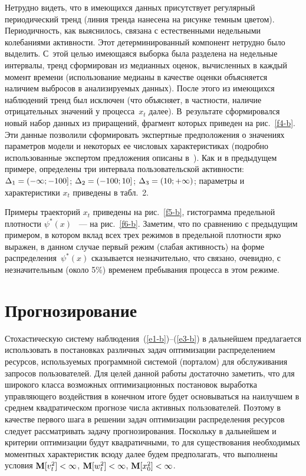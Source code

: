 \begin{multicols}{2}
\renewcommand{\figurename}{\protect\bf Рис.}
\renewcommand{\tablename}{\protect\bf Таблица}
\setcounter{table}{2}
\setcounter{figure}{6}

  
  Нетрудно видеть, что в имеющихся данных присутствует регулярный периодический 
тренд (линия тренда нанесена на рисунке темным цветом). Периодичность, как выяснилось, 
связана с естественными недельными колебаниями активности. Этот детерминированный 
компонент нетрудно было выделить. С~этой целью имеющаяся выборка была разделена на 
недельные интервалы, тренд сформирован из медианных оценок, вычисленных в каж\-дый 
момент времени (использование медианы в качестве оценки объясняется наличием выбросов 
в анализируемых данных). После этого из имеющихся наблюдений тренд был исключен (что 
объясняет, в частности, наличие отрицательных значений у процесса~$x_t$ далее). 
В~результате сформировался новый набор данных из приращений, фрагмент которых 
приведен на рис.~\ref{f4-b}. Эти данные позволили сформировать экспертные 
предположения о значениях параметров модели и некоторых ее числовых характеристиках 
(подробно использованные экспертом предложения описаны в~\cite{19-b}). Как и в 
предыдущем примере, определены три интервала пользовательской активности: $\Delta_1\hm=(-
\infty;-100]$; $\Delta_2\hm=(-100;10]$; $\Delta_3\hm=(10;+\infty)$; параметры и характеристики $x_t$ 
приведены в табл.~2.


  Примеры траекторий $x_t$ приведены на рис.~\ref{f5-b}, гистограмма предельной 
плотности $\psi^*(x)$ ~--- на рис.~\ref{f6-b}. Заметим, что по сравнению с предыдущим 
примером, в котором вклад всех трех режимов в предельной плотности ярко выражен, в 
данном случае первый режим (слабая активность) на форме распределения~$\psi^*(x)$ 
сказывается незначительно, что связано, очевидно, с незначительным (около 5\%) временем 
пребывания процесса в этом режиме.

\section{Прогнозирование}
  
  Стохастическую систему наблюдения~(\ref{e1-b})--(\ref{e3-b}) в дальнейшем 
предлагается использовать в постановках различных задач оптимизации распределением 
ресурсов, используемых программной сис\-те\-мой (порталом) для обслуживания запросов 
пользователей. Для целей данной работы достаточно заметить, что для широкого класса 
возможных оптимизационных постановок выработка управляющего воздействия в конечном 
итоге будет основываться на наилучшем в среднем квадратическом прогнозе чис\-ла активных 
пользователей. Поэтому в качестве первого шага в решении задач оптимизации 
распределения ресурсов следует рассматривать задачу прогнозирования. Поскольку в 
дальнейшем и критерии оптимизации будут квадратичными, то для существования 
необходимых моментных характеристик всюду далее будем предполагать, что выполнены 
условия $\mathbf{M}[v_t^2]\hm<\infty$, $\mathbf{M}[w_t^2]\hm<\infty$, 
$\mathbf{M}[x_0^2]\hm<\infty$.
  

\end{multicols}
